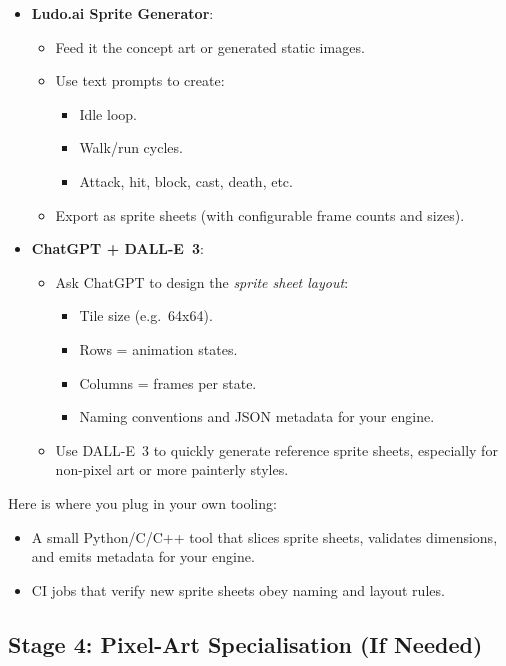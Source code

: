\documentclass[11pt]{article}
\begin{document}
\begin{itemize}
    \item \textbf{Ludo.ai Sprite Generator}:
    \begin{itemize}
        \item Feed it the concept art or generated static images.
        \item Use text prompts to create:
        \begin{itemize}
            \item Idle loop.
            \item Walk/run cycles.
            \item Attack, hit, block, cast, death, etc.
        \end{itemize}
        \item Export as sprite sheets (with configurable frame counts and sizes).
    \end{itemize}
    \item \textbf{ChatGPT + DALL-E~3}:
    \begin{itemize}
        \item Ask ChatGPT to design the \emph{sprite sheet layout}:
        \begin{itemize}
            \item Tile size (e.g.\ 64x64).
            \item Rows = animation states.
            \item Columns = frames per state.
            \item Naming conventions and JSON metadata for your engine.
        \end{itemize}
        \item Use DALL-E~3 to quickly generate reference sprite sheets, especially for non-pixel art or more painterly styles.
    \end{itemize}
\end{itemize}

Here is where you plug in your own tooling:
\begin{itemize}
    \item A small Python/C/C++ tool that slices sprite sheets, validates dimensions, and emits metadata for your engine.
    \item CI jobs that verify new sprite sheets obey naming and layout rules.
\end{itemize}

\subsection{Stage 4: Pixel-Art Specialisation (If Needed)}
\end{document}
